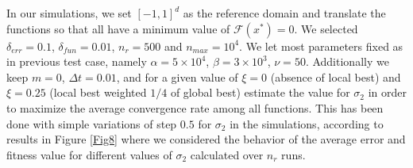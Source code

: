 \documentclass{ims9x6}
\newcommand{\TE}{\mathcal{F}}
\begin{document}
In our simulations, we set $[-1,1]^d$ as the reference domain and translate the functions so that all have a minimum value of $\TE(x^*)=0$. 
We selected $\delta_{err}=0.1$, $\delta_{fun}=0.01$, $n_r=500$ and $n_{max}=10^4$.
We let most parameters fixed as in previous test case, namely $\alpha = 5 \times 10^4$, $\beta = 3 \times 10^3$, $\nu=50$. Additionally we keep $m=0$, $\Delta t = 0.01$, and for a given value of $\xi=0$ (absence of local best) and $\xi=0.25$ (local best weighted $1/4$ of global best) estimate the value for $\sigma_2$ in order to maximize the average convergence rate among all functions. This has been done with simple variations of step $0.5$ for $\sigma_2$ in the simulations, according to results in Figure \ref{Fig8} where we considered the behavior of the average error and fitness value for different values of $\sigma_2$ calculated over $n_r$ runs.

\end{document}

